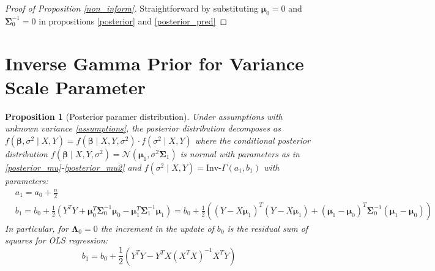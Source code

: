 \documentclass[10pt,fleqn]{amsart}
\newtheorem{proposition}[theorem]{Proposition}
\theoremstyle{definition}
\theoremstyle{remark}
\numberwithin{equation}{section}
\newcommand{\bbeta}{\boldsymbol{\beta}}
\newcommand{\mmu}{\boldsymbol{\mu}}
\newcommand{\SSigma}{\boldsymbol{\Sigma}}
\newcommand{\LLambda}{\boldsymbol{\Lambda}}
\newcommand{\XTY}{X^TY}
\newcommand{\YTX}{Y^TX}
\newcommand{\YTY}{Y^TY}
\newcommand{\XTXi}{\left(X^TX\right)^{-1}}
\newcommand{\invGamma}{\text{Inv-}\Gamma}
\begin{document}
\begin{proof}[Proof of Proposition \ref{non_inform}]
Straightforward by substituting $\mmu_0=0$ and $\SSigma_0^{-1}=0$ in propositions \ref{posterior} and \ref{posterior_pred}
\end{proof}

\section{Inverse Gamma Prior for Variance Scale Parameter}
\begin{proposition}[Posterior paramer distribution]\label{posterior_var}
    Under assumptions with unknown variance \ref{assumptions}, the posterior distribution decomposes as
    $f\left(\bbeta,\sigma^2\mid X, Y\right)=f\left(\bbeta\mid X, Y, \sigma^2\right)\cdot f\left(\sigma^2\mid X, Y\right)$ where the conditional posterior distribution $f(\bbeta\mid X, Y, \sigma^2)=\mathcal{N}(\mmu_1, \sigma^2\SSigma_1)$
    is normal with parameters as in \ref{posterior_mu}-\ref{posterior_mu2} and $f\left(\sigma^2\mid X, Y\right)=\invGamma\left(a_1, b_1\right)$
    with parameters:
    \begin{align}
        \label{posterior_sigsq}&a_1=a_0+\frac n 2&&\\
        \label{posterior_sigsq2}&b_1=b_0+\frac 12\left(\YTY+\mmu_0^T\SSigma_0^{-1}\mmu_0-\mmu_1^T\SSigma_1^{-1}\mmu_1\right)=
        b_0+\frac 12\left(\left(Y-X\mmu_1\right)^T\left(Y-X\mmu_1\right)+\left(\mmu_1-\mmu_0\right)^T\SSigma_0^{-1}\left(\mmu_1-\mmu_0\right)\right)&&
    \end{align}
    In particular, for $\LLambda_0=0$ the increment in the update of $b_0$ is the residual sum of squares for OLS regression:
    \begin{equation*}
        b_1=b_0+\frac 12 \left(\YTY-\YTX\XTXi\XTY\right)
    \end{equation*}
\end{proposition}
\end{document}
